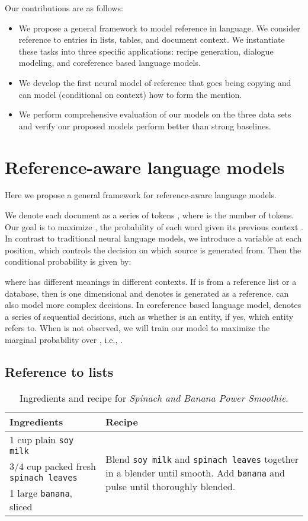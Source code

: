 \documentclass[11pt,letterpaper]{article}
\begin{document}
Our contributions are as follows:
\begin{itemize}
\item We propose a general framework to model reference in language. We
  consider reference to entries in lists, tables, and document context. We
  instantiate these tasks into three specific applications: recipe generation,
  dialogue modeling, and coreference based language models.
\item We develop the first neural model of reference that goes being 
copying and can model (conditional on context) how to form the mention.
\item We perform comprehensive evaluation of our models on the three data sets
  and verify our proposed models perform better than strong baselines.
\end{itemize}




\section{Reference-aware language models}
Here we propose a general framework for reference-aware language models.

We denote each document as a series of tokens , where  is
the number of tokens.  Our goal is to maximize , the
probability of each word  given its previous context
.  In contrast to traditional neural language
models, we introduce a variable  at each position, which controls the
decision on which source  is generated from. Then the conditional
probability is given by:

where  has different meanings in different contexts. If  is from
a reference list or a database, then  is one dimensional and 
denotes  is generated as a reference.  can also model more complex
decisions. In coreference based language model,  denotes a series of
sequential decisions, such as whether  is an entity, if yes, which
entity  refers to. When  is not observed, we will train our model
to maximize the marginal probability over , i.e., 
.

\subsection{Reference to lists}
\begin{table*}[!thbp]
  \centering
  \begin{tabular}{l | l}
    Ingredients & Recipe \\
    \hline
    1 cup plain \texttt{soy milk} & \multirow{3}{7cm}{Blend \texttt{soy milk} and \texttt{spinach leaves} together in a blender until smooth. Add \texttt{banana} and pulse until thoroughly blended.} \\
    3/4 cup packed fresh \texttt{spinach leaves}  \\
    1 large \texttt{banana}, sliced
  \end{tabular}
  \caption{Ingredients and recipe for {\em Spinach and Banana Power Smoothie}.}
  \label{tab:recipe_example}
\end{table*}
\end{document}
